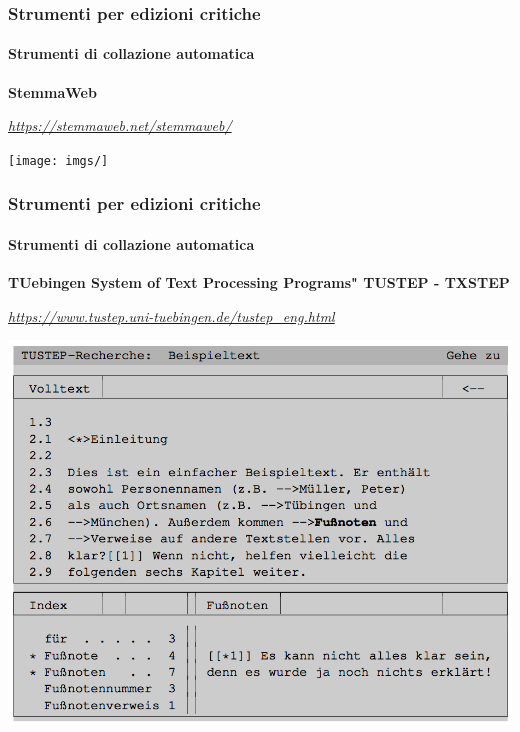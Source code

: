 \begin{frame}
    \frametitle{Strumenti per edizioni critiche}
    \framesubtitle{Strumenti di collazione automatica}
	\addtocounter{nframe}{1}
    \begin{center}
        \textbf{StemmaWeb}
    \end{center}
    \begin{center}
        \textit{\url{https://stemmaweb.net/stemmaweb/}}
	\end{center}
    \begin{center}
        \texttt{[image: imgs/]}
	\end{center}
\end{frame}

\begin{frame}
    \frametitle{Strumenti per edizioni critiche}
    \framesubtitle{Strumenti di collazione automatica}
	\addtocounter{nframe}{1}
    \begin{center}
        \textbf{TUebingen System of Text Processing Programs" TUSTEP - TXSTEP}
    \end{center}
    \begin{center}
        \textit{\url{https://www.tustep.uni-tuebingen.de/tustep_eng.html}}
	\end{center}
    \begin{center}
        \includegraphics[width=.95\textwidth]{imgs/tustep.png}
	\end{center}
\end{frame}

